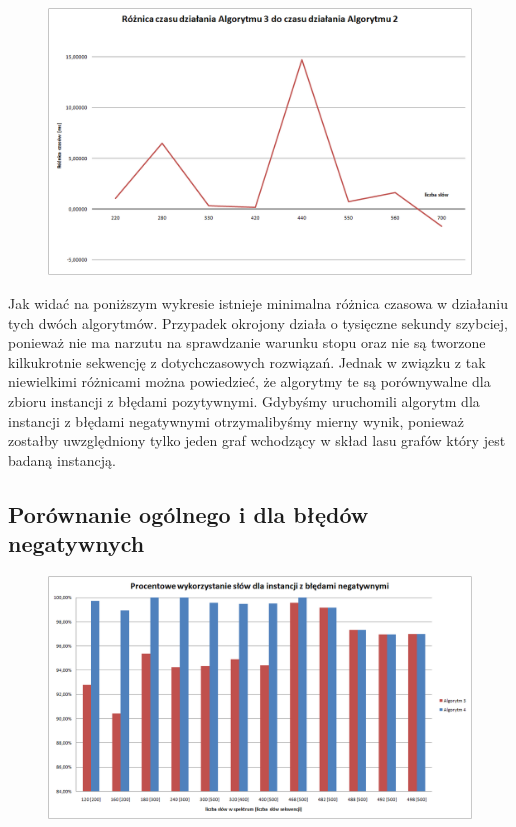 \documentclass[a4paper,10pt]{article}
\begin{document}
\begin{figure}[h]
  \footnotesize\centering
  \includegraphics[width=\textwidth,keepaspectratio]{timeDiff_general_vs_positive.png}
\end{figure}

Jak widać na poniższym wykresie istnieje minimalna różnica czasowa w działaniu tych dwóch algorytmów. Przypadek okrojony działa o tysięczne sekundy szybciej, ponieważ nie ma narzutu na sprawdzanie warunku stopu oraz nie są tworzone kilkukrotnie sekwencję z dotychczasowych rozwiązań. Jednak w związku z tak niewielkimi różnicami można powiedzieć, że algorytmy te są porównywalne dla zbioru instancji z błędami pozytywnymi.
Gdybyśmy uruchomili algorytm dla instancji z błędami negatywnymi otrzymalibyśmy mierny wynik, ponieważ zostałby uwzględniony tylko jeden graf wchodzący w skład lasu grafów który jest badaną instancją.

\subsection{Porównanie ogólnego i dla błędów negatywnych}

\begin{figure}[h]
  \footnotesize\centering
  \includegraphics[width=\textwidth,keepaspectratio]{percentageUsedWords_general_vs_negative.png}
\end{figure}
\end{document}
